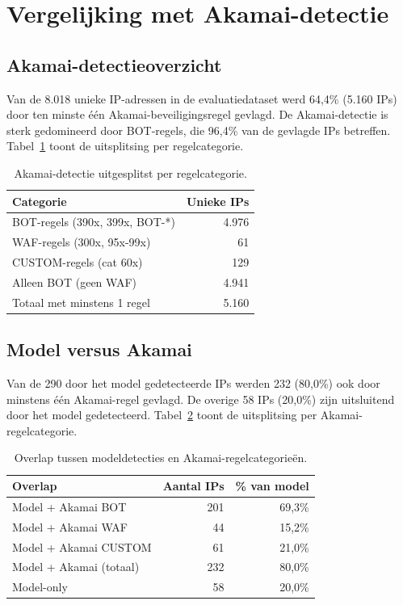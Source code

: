\section{Vergelijking met Akamai-detectie}
\label{sec:resultaten-vergelijking-akamai}
 
\subsection{Akamai-detectieoverzicht}
 
Van de 8.018 unieke IP-adressen in de evaluatiedataset werd 64,4\% (5.160 IPs) door ten minste één Akamai-beveiligingsregel gevlagd. De Akamai-detectie is sterk gedomineerd door BOT-regels, die 96,4\% van de gevlagde IPs betreffen. Tabel~\ref{tab:akamai-breakdown} toont de uitsplitsing per regelcategorie.
 
\begin{table}[h]
\centering
\caption{Akamai-detectie uitgesplitst per regelcategorie.}
\label{tab:akamai-breakdown}
\begin{tabular}{l r}
\hline
\textbf{Categorie} & \textbf{Unieke IPs} \\
\hline
BOT-regels (390x, 399x, BOT-*) & 4.976 \\
WAF-regels (300x, 95x-99x) & 61 \\
CUSTOM-regels (cat 60x) & 129 \\
Alleen BOT (geen WAF) & 4.941 \\
\hline
Totaal met minstens 1 regel & 5.160 \\
\hline
\end{tabular}
\end{table}
 
\subsection{Model versus Akamai}
 
Van de 290 door het model gedetecteerde IPs werden 232 (80,0\%) ook door minstens één Akamai-regel gevlagd. De overige 58 IPs (20,0\%) zijn uitsluitend door het model gedetecteerd. Tabel~\ref{tab:model-vs-akamai-detail} toont de uitsplitsing per Akamai-regelcategorie.
 
\begin{table}[h]
\centering
\caption{Overlap tussen modeldetecties en Akamai-regelcategorieën.}
\label{tab:model-vs-akamai-detail}
\begin{tabular}{l r r}
\hline
\textbf{Overlap} & \textbf{Aantal IPs} & \textbf{\% van model} \\
\hline
Model + Akamai BOT & 201 & 69,3\% \\
Model + Akamai WAF & 44 & 15,2\% \\
Model + Akamai CUSTOM & 61 & 21,0\% \\
Model + Akamai (totaal) & 232 & 80,0\% \\
Model-only & 58 & 20,0\% \\
\hline
\end{tabular}
\end{table}
 
